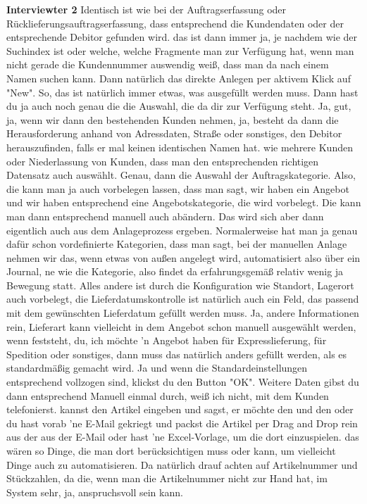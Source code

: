 \textbf{Interviewter 2}\newline
Identisch ist wie bei der Auftragserfassung oder Rücklieferungsauftragserfassung, dass entsprechend die Kundendaten oder der entsprechende Debitor gefunden wird.
das ist dann immer ja, je nachdem wie der Suchindex ist oder welche, welche Fragmente man zur Verfügung hat, wenn man nicht gerade die Kundennummer auswendig weiß, dass man da nach einem Namen suchen kann. Dann natürlich das direkte Anlegen per aktivem Klick auf "New". So, das ist natürlich immer etwas, was ausgefüllt werden muss. Dann hast du ja auch noch genau die die Auswahl, die da dir zur Verfügung steht. Ja, gut, ja, wenn wir dann den bestehenden Kunden nehmen, ja, besteht da dann die Herausforderung anhand von Adressdaten, Straße oder sonstiges, den Debitor herauszufinden, falls er mal keinen identischen Namen hat.
wie mehrere Kunden oder Niederlassung von Kunden, dass man den entsprechenden richtigen Datensatz auch auswählt.
Genau, dann die Auswahl der Auftragskategorie. Also, die kann man ja auch vorbelegen lassen, dass man sagt, wir haben ein Angebot und wir haben entsprechend eine Angebotskategorie, die wird vorbelegt. Die kann man dann entsprechend manuell auch abändern.
Das wird sich aber dann eigentlich auch aus dem Anlageprozess ergeben. Normalerweise hat man ja genau dafür schon vordefinierte Kategorien, dass man sagt, bei der manuellen Anlage nehmen wir das, wenn etwas von außen angelegt wird, automatisiert also über ein Journal, ne wie die Kategorie, also findet da erfahrungsgemäß relativ wenig ja Bewegung statt.
Alles andere ist durch die Konfiguration wie Standort, Lagerort auch vorbelegt, die Lieferdatumskontrolle ist natürlich auch ein Feld, das passend mit dem gewünschten Lieferdatum gefüllt werden muss. 
Ja, andere Informationen rein, Lieferart kann vielleicht in dem Angebot schon manuell ausgewählt werden, wenn feststeht, du, ich möchte 'n Angebot haben für Expresslieferung, für Spedition oder sonstiges, dann muss das natürlich anders gefüllt werden, als es standardmäßig gemacht wird.
Ja und wenn die Standardeinstellungen entsprechend vollzogen sind, klickst du den Button "OK".
Weitere Daten gibst du dann entsprechend Manuell einmal durch, weiß ich nicht, mit dem Kunden telefonierst.
kannst den Artikel eingeben und sagst, er möchte den und den oder du hast vorab 'ne E-Mail gekriegt und packst die Artikel per Drag and Drop rein aus der aus der E-Mail oder hast 'ne Excel-Vorlage, um die dort einzuspielen.
das wären so Dinge, die man dort berücksichtigen muss oder kann, um vielleicht Dinge auch zu automatisieren. Da natürlich drauf achten auf Artikelnummer und Stückzahlen, da die, wenn man die Artikelnummer nicht zur Hand hat, im System sehr, ja, anspruchsvoll sein kann.

